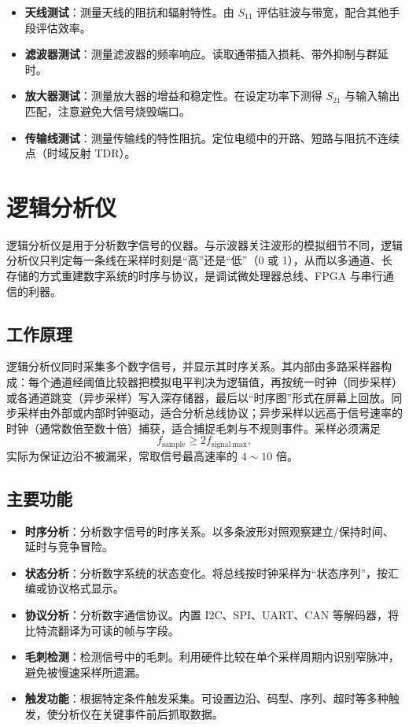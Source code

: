 \begin{itemize}
    \item \textbf{天线测试}：测量天线的阻抗和辐射特性。由 $S_{11}$ 评估驻波与带宽，配合其他手段评估效率。
    \item \textbf{滤波器测试}：测量滤波器的频率响应。读取通带插入损耗、带外抑制与群延时。
    \item \textbf{放大器测试}：测量放大器的增益和稳定性。在设定功率下测得 $S_{21}$ 与输入输出匹配，注意避免大信号烧毁端口。
    \item \textbf{传输线测试}：测量传输线的特性阻抗。定位电缆中的开路、短路与阻抗不连续点（时域反射 TDR）。
\end{itemize}

\section{逻辑分析仪}
\label{sec:logic_analyzer}

逻辑分析仪是用于分析数字信号的仪器。与示波器关注波形的模拟细节不同，逻辑分析仪只判定每一条线在采样时刻是“高”还是“低”（0 或 1），从而以多通道、长存储的方式重建数字系统的时序与协议，是调试微处理器总线、FPGA 与串行通信的利器。

\subsection{工作原理}

逻辑分析仪同时采集多个数字信号，并显示其时序关系。其内部由多路采样器构成：每个通道经阈值比较器把模拟电平判决为逻辑值，再按统一时钟（同步采样）或各通道跳变（异步采样）写入深存储器，最后以“时序图”形式在屏幕上回放。同步采样由外部或内部时钟驱动，适合分析总线协议；异步采样以远高于信号速率的时钟（通常数倍至数十倍）捕获，适合捕捉毛刺与不规则事件。采样必须满足
\[
    f_{\mathrm{sample}} \ge 2 f_{\mathrm{signal\ max}} ,
\]
实际为保证边沿不被漏采，常取信号最高速率的 $4\sim10$ 倍。

\subsection{主要功能}

\begin{itemize}
    \item \textbf{时序分析}：分析数字信号的时序关系。以多条波形对照观察建立/保持时间、延时与竞争冒险。
    \item \textbf{状态分析}：分析数字系统的状态变化。将总线按时钟采样为“状态序列”，按汇编或协议格式显示。
    \item \textbf{协议分析}：分析数字通信协议。内置 I2C、SPI、UART、CAN 等解码器，将比特流翻译为可读的帧与字段。
    \item \textbf{毛刺检测}：检测信号中的毛刺。利用硬件比较在单个采样周期内识别窄脉冲，避免被慢速采样所遗漏。
    \item \textbf{触发功能}：根据特定条件触发采集。可设置边沿、码型、序列、超时等多种触发，使分析仪在关键事件前后抓取数据。
\end{itemize}

